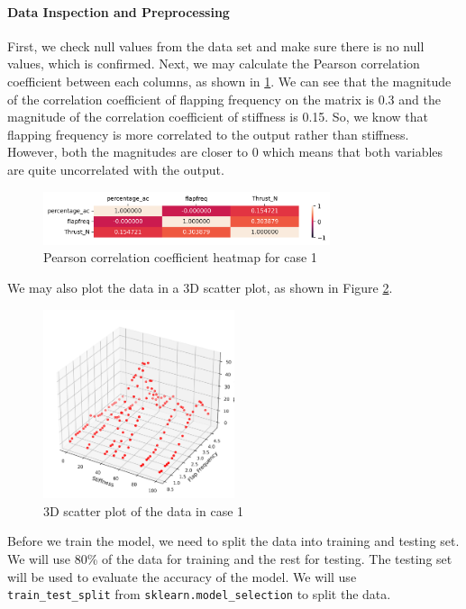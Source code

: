 \documentclass[conf]{new-aiaa}
\begin{document}
\paragraph{Data Inspection and Preprocessing}
First, we check null values from the data set and make sure there is no null values, which is confirmed. Next, we may calculate the Pearson correlation coefficient between each columns, as shown in \ref{fig:case1_corr_heatmap}. We can see that the magnitude of the correlation coefficient of flapping frequency on the matrix is 0.3 and the magnitude of the correlation coefficient of stiffness is 0.15. So, we know that flapping frequency is more correlated to the output rather than stiffness. However, both the magnitudes are closer to 0 which means that both variables are quite uncorrelated with the output.
\begin{figure}[H]
    \centering
    \includegraphics[width=0.75\textwidth]{graph/case1_corr_heatmap.png}
    \caption{\label{fig:case1_corr_heatmap} Pearson correlation coefficient heatmap for case 1}
\end{figure}
We may also plot the data in a 3D scatter plot, as shown in Figure \ref{fig:case1_3d_scatter}.
\begin{figure}[H]
    \centering
    \includegraphics[width=0.5\textwidth]{graph/case1_3d_scatter.png}
    \caption{\label{fig:case1_3d_scatter} 3D scatter plot of the data in case 1}
\end{figure}
Before we train the model, we need to split the data into training and testing set. We will use 80\% of the data for training and the rest for testing. The testing set will be used to evaluate the accuracy of the model. We will use \texttt{train\_test\_split} from \texttt{sklearn.model\_selection} to split the data. 
\end{document}
